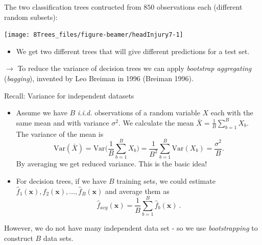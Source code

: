 \documentclass[10pt,ignorenonframetext,]{beamer}
\providecommand{\tightlist}{%
  \setlength{\itemsep}{0pt}\setlength{\parskip}{0pt}}
\begin{document}
\begin{frame}

The two classification trees contructed from \(850\) observations each
(different random subsets):

\begin{center}\texttt{[image: 8Trees\_files/figure-beamer/headInjury7-1]} \end{center}

\begin{itemize}
\tightlist
\item
  We get two different trees that will give different predictions for a
  test set.
\end{itemize}

\(\rightarrow\) To reduce the variance of decision trees we can apply
\emph{bootstrap aggregating} (\emph{bagging}), invented by Leo Breiman
in 1996 (Breiman 1996).

\end{frame}

\begin{frame}

\begin{block}{Recall: Variance for independent datasets}

\vspace{2mm}

\begin{itemize}
\item
  Assume we have \(B\) \emph{i.i.d.} observations of a random variable
  \(X\) each with the same mean and with variance \(\sigma^2\). We
  calculate the mean \(\bar{X} = \frac{1}{B} \sum_{b=1}^B X_b\). The
  variance of the mean is
  \[\text{Var}(\bar{X}) = \text{Var}\Big(\frac{1}{B}\sum_{b=1}^B X_b \Big) = \frac{1}{B^2} \sum_{b=1}^B \text{Var}(X_b) = \frac{\sigma^2}{B}.\]
  By averaging we get reduced variance. This is the basic idea!
\item
  For decision trees, if we have \(B\) training sets, we could estimate
  \(\hat{f}_1({\boldsymbol x}),\hat{f}_2({\boldsymbol x}),\ldots, \hat{f}_B({\boldsymbol x})\)
  and average them as
  \[ \hat{f}_{avg}({\boldsymbol x})=\frac{1}{B}\sum_{b=1}^B \hat{f}_b({\boldsymbol x}) \ .\]
\end{itemize}

However, we do not have many independent data set - so we use
\emph{bootstrapping} to construct \(B\) data sets.

\end{block}

\end{frame}
\end{document}
